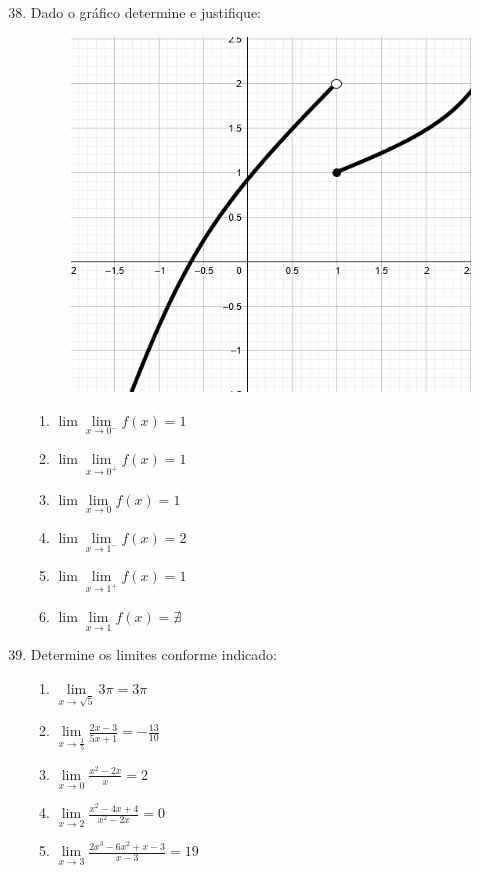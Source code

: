 \documentclass[oneside,a4paper,12pt]{article}
\begin{document}
\begin{enumerate}
	\setcounter{enumi}{37}

	\item Dado o gráfico determine e justifique:
	\begin{figure}[!h]
		\centering
		\includegraphics[scale=0.6]{ex1}
		\label{ex1}
	\end{figure}
	\begin{multicols}{2}
	\begin{enumerate}
		\item $\lim\lim\limits_{x\rightarrow 0^{-}}f(x) = 1$
		\item $\lim\lim\limits_{x\rightarrow 0^{+}}f(x) = 1$
		\item $\lim\lim\limits_{x\rightarrow 0}f(x) = 1$
		\item $\lim\lim\limits_{x\rightarrow 1^{-}}f(x) = 2$
		\item $\lim\lim\limits_{x\rightarrow 1^{+}}f(x) = 1$
		\item $\lim\lim\limits_{x\rightarrow 1}f(x) = \nexists$
	\end{enumerate}
	\end{multicols}

	\item Determine os limites conforme indicado:
	\begin{multicols}{2}
	\begin{enumerate}
		\item $\lim\limits_{x\rightarrow \sqrt{5}}3\pi = 3\pi$
		\item $\lim\limits_{x\rightarrow \frac{1}{5}}\frac{2x-3}{5x+1} = -\frac{13}{10}$
		\item $\lim\limits_{x\rightarrow 0}\frac{x^2 - 2x}{x} = 2$
		\item $\lim\limits_{x\rightarrow 2}\frac{x^2 - 4x + 4}{x^2 - 2x} = 0$
		\item $\lim\limits_{x\rightarrow 3}\frac{2x^3 - 6x^2 + x - 3}{x-3} = 19$
	\end{enumerate}
	\end{multicols}


\end{enumerate}
\end{document}
